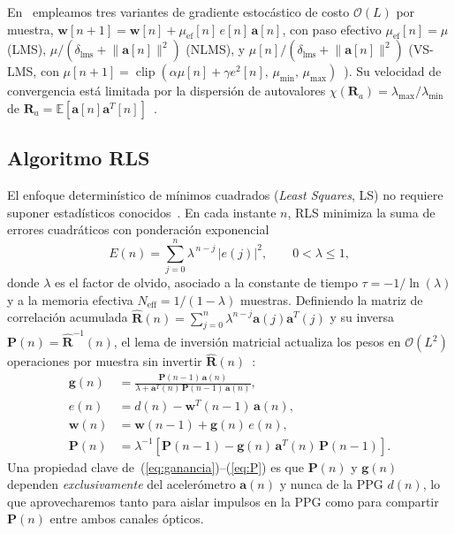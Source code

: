 \documentclass[conference]{IEEEtran}
\begin{document}
En~\cite{informe1} empleamos tres variantes de gradiente estocástico de costo $\mathcal{O}(L)$ por muestra, $\mathbf{w}[n+1]=\mathbf{w}[n]+\mu_{\text{ef}}[n]\,e[n]\,\mathbf{a}[n]$, con paso efectivo $\mu_{\text{ef}}[n]=\mu$ (LMS), $\mu/(\delta_{\text{lms}}+\lVert\mathbf{a}[n]\rVert^2)$ (NLMS), y $\mu[n]/(\delta_{\text{lms}}+\lVert\mathbf{a}[n]\rVert^2)$ (VS-LMS, con $\mu[n+1]=\operatorname{clip}(\alpha\mu[n]+\gamma e^2[n],\,\mu_{\min},\,\mu_{\max})$~\cite{kwong1992vslms}). Su velocidad de convergencia está limitada por la dispersión de autovalores $\chi(\mathbf{R}_a)=\lambda_{\max}/\lambda_{\min}$ de $\mathbf{R}_a=\mathbb{E}[\mathbf{a}[n]\mathbf{a}^T[n]]$~\cite{haykin2014}.

\subsection{Algoritmo RLS}
\label{sec:rls}

El enfoque determinístico de mínimos cuadrados (\textit{Least Squares}, LS) no requiere suponer estadísticos conocidos~\cite{ressl2026pas}. En cada instante $n$, RLS minimiza la suma de errores cuadráticos con ponderación exponencial
\begin{equation}
E(n)=\sum_{j=0}^{n}\lambda^{\,n-j}\,|e(j)|^2,\qquad 0<\lambda\le 1,
\label{eq:costo_rls}
\end{equation}
donde $\lambda$ es el factor de olvido, asociado a la constante de tiempo $\tau=-1/\ln(\lambda)$ y a la memoria efectiva $N_{\text{eff}}=1/(1-\lambda)$ muestras. Definiendo la matriz de correlación acumulada $\hat{\mathbf{R}}(n)=\sum_{j=0}^n\lambda^{n-j}\mathbf{a}(j)\mathbf{a}^T(j)$ y su inversa $\mathbf{P}(n)=\hat{\mathbf{R}}^{-1}(n)$, el lema de inversión matricial actualiza los pesos en $\mathcal{O}(L^2)$ operaciones por muestra sin invertir $\hat{\mathbf{R}}(n)$~\cite{haykin2014,ressl2026pas}:
\begin{align}
\mathbf{g}(n)&=\frac{\mathbf{P}(n-1)\,\mathbf{a}(n)}{\lambda+\mathbf{a}^T(n)\,\mathbf{P}(n-1)\,\mathbf{a}(n)},\label{eq:ganancia}\\
e(n)&=d(n)-\mathbf{w}^T(n-1)\,\mathbf{a}(n),\label{eq:error_priori}\\
\mathbf{w}(n)&=\mathbf{w}(n-1)+\mathbf{g}(n)\,e(n),\label{eq:update}\\
\mathbf{P}(n)&=\lambda^{-1}\!\left[\mathbf{P}(n-1)-\mathbf{g}(n)\,\mathbf{a}^T(n)\,\mathbf{P}(n-1)\right].\label{eq:P}
\end{align}
Una propiedad clave de~(\ref{eq:ganancia})--(\ref{eq:P}) es que $\mathbf{P}(n)$ y $\mathbf{g}(n)$ dependen \emph{exclusivamente} del acelerómetro $\mathbf{a}(n)$ y nunca de la PPG $d(n)$, lo que aprovecharemos tanto para aislar impulsos en la PPG como para compartir $\mathbf{P}(n)$ entre ambos canales ópticos.
\end{document}
